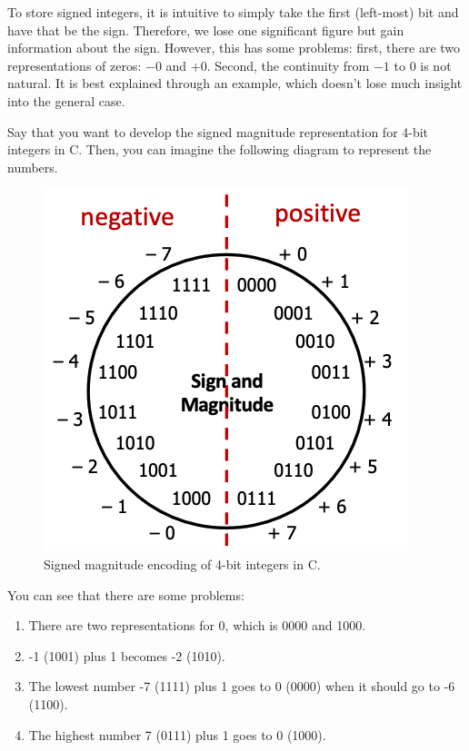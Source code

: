 \documentclass{article}
\begin{document}
    To store signed integers, it is intuitive to simply take the first (left-most) bit and have that be the sign. Therefore, we lose one significant figure but gain information about the sign. However, this has some problems: first, there are two representations of zeros: $-0$ and $+0$. Second, the continuity from $-1$ to $0$ is not natural. It is best explained through an example, which doesn't lose much insight into the general case. 

    \begin{example}
      Say that you want to develop the signed magnitude representation for 4-bit integers in C. Then, you can imagine the following diagram to represent the numbers. 
      \begin{figure}[H]
        \centering 
        \includegraphics[scale=0.4]{img/signed_magnitude_encoding.png}
        \caption{Signed magnitude encoding of 4-bit integers in C.} 
        \label{fig:signed_magnitude_encoding}
      \end{figure}
      You can see that there are some problems: 
      \begin{enumerate}
        \item There are two representations for $0$, which is 0000 and 1000. 
        \item -1 (1001) plus 1 becomes -2 (1010). 
        \item The lowest number -7 (1111) plus 1 goes to 0 (0000) when it should go to -6 (1100). 
        \item The highest number 7 (0111) plus 1 goes to 0 (1000). 
      \end{enumerate}
    \end{example}
\end{document}
